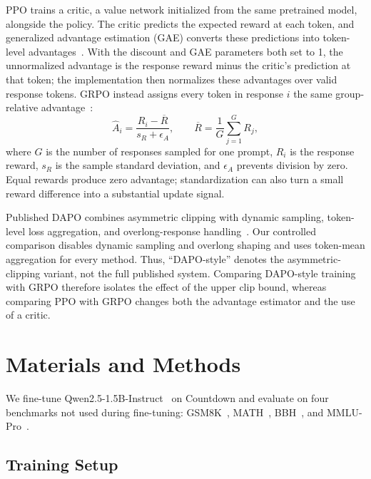 \documentclass[ai,article,submit,oneauthor]{Definitions/mdpi}
\begin{document}
PPO trains a critic, a value network initialized from the same pretrained model, alongside the policy. The critic predicts the expected reward at each token, and generalized advantage estimation (GAE) converts these predictions into token-level advantages~\cite{schulman2015high,schulman2017proximalpolicyoptimizationalgorithms}. With the discount and GAE parameters both set to 1, the unnormalized advantage is the response reward minus the critic's prediction at that token; the implementation then normalizes these advantages over valid response tokens. GRPO instead assigns every token in response $i$ the same group-relative advantage~\cite{shao2024deepseekmathpushinglimitsmathematical}:
\begin{equation}\label{eq:grpo_advantage}
\widehat{A}_i=\frac{R_i-\overline{R}}{s_R+\epsilon_A},
\qquad \overline{R}=\frac{1}{G}\sum_{j=1}^{G}R_j,
\end{equation}
where $G$ is the number of responses sampled for one prompt, $R_i$ is the response reward, $s_R$ is the sample standard deviation, and $\epsilon_A$ prevents division by zero. Equal rewards produce zero advantage; standardization can also turn a small reward difference into a substantial update signal.

Published DAPO combines asymmetric clipping with dynamic sampling, token-level loss aggregation, and overlong-response handling~\cite{yu2025dapo}. Our controlled comparison disables dynamic sampling and overlong shaping and uses token-mean aggregation for every method. Thus, ``DAPO-style'' denotes the asymmetric-clipping variant, not the full published system. Comparing DAPO-style training with GRPO therefore isolates the effect of the upper clip bound, whereas comparing PPO with GRPO changes both the advantage estimator and the use of a critic.

\section{Materials and Methods}\label{sec:methods_data}

We fine-tune Qwen2.5-1.5B-Instruct~\cite{qwen2.5} on Countdown and evaluate on four benchmarks not used during fine-tuning: GSM8K~\cite{cobbe2021gsm8k}, MATH~\cite{hendrycks2021measuringmathematicalproblemsolving}, BBH~\cite{suzgun2022challenging}, and MMLU-Pro~\cite{wang2024mmlupro}.

\subsection{Training Setup}
\end{document}
